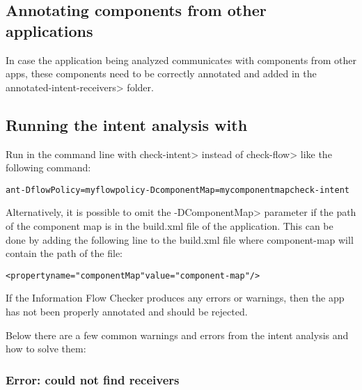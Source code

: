 
\subsection{Annotating components from other applications}
In case the application being analyzed communicates with components from
other apps, these components need to be correctly annotated and added in the 
\<annotated-intent-receivers> folder.

\subsection{Running the intent analysis with \TheFlowChecker{}}

Run \theFlowChecker{} in the command line with \<check-intent> instead of
\<check-flow> like the following command: 


\begin{alltt}
ant -DflowPolicy=myflowpolicy -DcomponentMap=mycomponentmap check-intent
\end{alltt}

Alternatively, it is possible to omit the \<-DComponentMap> parameter if the 
path of the component map is in the 
build.xml file of the application. This can be done by adding the following 
line to the build.xml file where component-map will contain the path of the file:

\begin{alltt}
<property name="componentMap" value="component-map"/>
\end{alltt}

If the Information Flow Checker produces any errors or warnings, then the app
has not been properly annotated and should be rejected.

Below there are a few common warnings and errors from the intent analysis and 
how to solve them:

\subsubsection{Error: could not find receivers}

